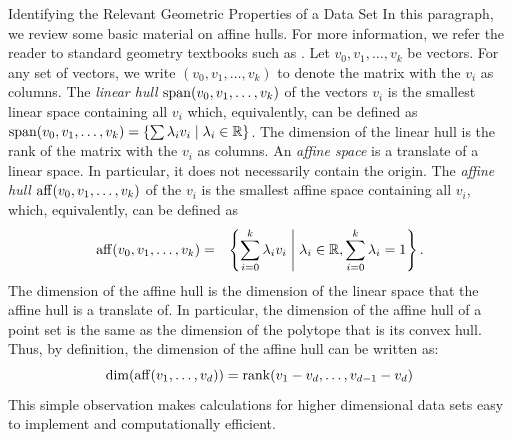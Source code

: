 \documentclass{llncs}
\begin{document}
\begin{section}{Identifying the Relevant Geometric Properties of a Data Set}
In this paragraph, we review some basic material on affine hulls. For more information, we refer the reader to standard geometry textbooks such as \cite{webster,Ziegler1995}. Let $v_0,v_1,\dots, v_k$ be vectors. For any set of vectors, we write $(v_0,v_1,\dots,v_k)$ to denote the matrix with the $v_i$ as columns. The {\em linear hull} $\operatorname{span}(v_0,v_1,\dots,v_k)$ of the vectors $v_i$ is the smallest linear space  containing all $v_i$ which, equivalently, can be defined as $\operatorname{span}(v_0,v_1,\dots,v_k) = \left\{ \sum \lambda_iv_i \;\middle| \; \lambda_i \in \mathbb{R} \right\}$.
The dimension of the linear hull is the rank of the matrix with the $v_i$ as columns. An {\em affine space} is a translate of a linear space. In particular, it does not necessarily contain the origin. The {\em affine hull} $\operatorname{aff}(v_0,v_1,\dots,v_k)$ of the $v_i$ is the smallest affine space containing all $v_i$, which, equivalently, can be defined as
\begin{eqnarray*}
\operatorname{aff}(v_0,v_1,\dots,v_k) &=& \left\{ \sum_{i=0}^k\lambda_iv_i \;\middle| \; \lambda_i\in \mathbb{R}, \sum_{i=0}^k\lambda_i = 1 \right\}.
\end{eqnarray*}
The dimension of the affine hull is the dimension of the linear space that the affine hull is a translate of. In particular, the dimension of the affine hull of a point set is the same as the dimension of the polytope that is its convex hull. Thus, by definition, the dimension of the affine hull can be written as: 
\[
\dim(\operatorname{aff}(v_1,\ldots,v_d)) = \operatorname{rank}(v_1-v_d,\ldots,v_{d-1}-v_d)
\]
This simple observation makes calculations for higher dimensional data sets easy to implement and computationally efficient.


\end{section}
\end{document}
